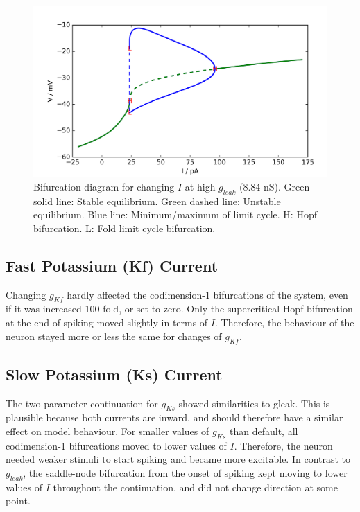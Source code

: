\documentclass[12pt,a4paper,]{report}
\begin{document}
\begin{figure}
\centering
\includegraphics[]{images/bifurcation_gleak=8.84.png}
\caption[Bifurcation diagram for changing $I$ at high $g_{leak}$]{Bifurcation diagram for changing $I$ at high $g_{leak}$
(8.84 nS). Green solid line: Stable equilibrium. Green dashed line:
Unstable equilibrium. Blue line: Minimum/maximum of limit cycle. H: Hopf
bifurcation. L: Fold limit cycle bifurcation.}\label{high-gleak}
\end{figure}

\subsection{Fast Potassium (Kf)
Current}\label{fast-potassium-kf-current}

Changing $g_{Kf}$ hardly affected the codimension-1 bifurcations of the
system, even if it was increased 100-fold, or set to zero. Only the
supercritical Hopf bifurcation at the end of spiking moved slightly in
terms of $I$. Therefore, the behaviour of the neuron stayed more or less
the same for changes of $g_{Kf}$.

\subsection{Slow Potassium (Ks)
Current}\label{slow-potassium-ks-current}

The two-parameter continuation for $g_{Ks}$ showed similarities to
gleak. This is plausible because both currents are inward, and should
therefore have a similar effect on model behaviour. For smaller values
of $g_{Ks}$ than default, all codimension-1 bifurcations moved to lower
values of $I$. Therefore, the neuron needed weaker stimuli to start
spiking and became more excitable. In contrast to $g_{leak}$, the
saddle-node bifurcation from the onset of spiking kept moving to lower
values of $I$ throughout the continuation, and did not change direction
at some point.
\end{document}
